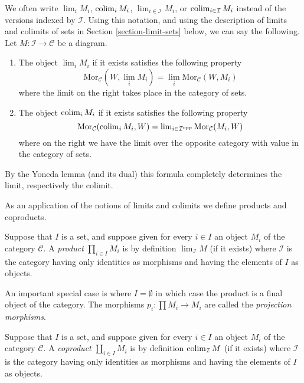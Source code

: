 \begin{remark}
\label{remark-limit-colim}
We often write $\lim_i M_i$, $\mathop{\rm colim}\nolimits_i M_i$,
$\lim_{i\in \mathcal{I}} M_i$, or $\mathop{\rm colim}\nolimits_{i\in \mathcal{I}} M_i$
instead of the versions indexed by $\mathcal{I}$.
Using this notation, and using the description of
limits and colimits of sets in Section \ref{section-limit-sets}
below, we can say the following.
Let $M : \mathcal{I} \to \mathcal{C}$ be a diagram.
\begin{enumerate}
\item The object $\lim_i M_i$ if it exists satisfies the following property
$$
\text{Mor}_{\mathcal{C}}(W, \lim_i M_i)
=
\lim_i \text{Mor}_{\mathcal{C}}(W, M_i)
$$
where the limit on the right takes place in the category of sets.
\item The object $\mathop{\rm colim}\nolimits_i M_i$ if it
exists satisfies the following property
$$
\text{Mor}_{\mathcal{C}}(\mathop{\rm colim}\nolimits_i M_i, W)
=
\mathop{\rm lim}\nolimits_{i\in \mathcal{I}^\text{opp}} \text{Mor}_{\mathcal{C}}(M_i, W)
$$
where on the right we have the limit over the opposite category
with value in the category of sets.
\end{enumerate}
By the Yoneda lemma (and its dual) this formula completely determines the
limit, respectively the colimit.
\end{remark}

\noindent
As an application of the notions of limits and colimits
we define products and coproducts.

\begin{definition}
\label{definition-product}
Suppose that $I$ is a set, and suppose given for every $i \in I$ an
object $M_i$ of the category $\mathcal{C}$. A {\it product}
$\prod_{i\in I} M_i$ is by definition $\lim_{\mathcal{I}} M$
(if it exists)
where $\mathcal{I}$ is the category having only identities as
morphisms and having the elements of $I$ as objects.
\end{definition}

\noindent
An important special case is where $I = \emptyset$ in which case the
product is a final object of the category.
The morphisms $p_i : \prod M_i \to M_i$ are called the
{\it projection morphisms}.

\begin{definition}
\label{definition-coproduct}
Suppose that $I$ is a set, and suppose given for every $i \in I$ an
object $M_i$ of the category $\mathcal{C}$. A {\it coproduct}
$\coprod_{i\in I} M_i$ is by definition $\mathop{\rm colim}\nolimits_{\mathcal{I}} M$
(if it exists) where $\mathcal{I}$ is the category having only
identities as morphisms and having the elements of $I$ as objects.
\end{definition}

